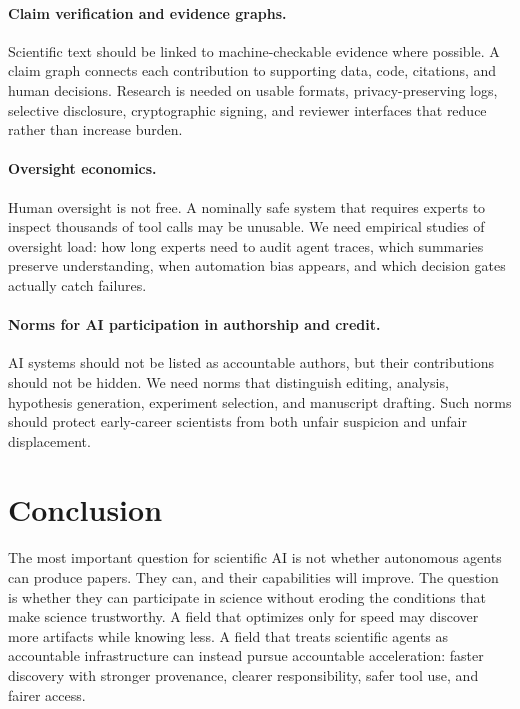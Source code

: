 \documentclass{article}
\newcommand{\position}{accountable acceleration}
\begin{document}
\paragraph{Claim verification and evidence graphs.} Scientific text should be linked to machine-checkable evidence where possible. A claim graph connects each contribution to supporting data, code, citations, and human decisions. Research is needed on usable formats, privacy-preserving logs, selective disclosure, cryptographic signing, and reviewer interfaces that reduce rather than increase burden.

\paragraph{Oversight economics.} Human oversight is not free. A nominally safe system that requires experts to inspect thousands of tool calls may be unusable. We need empirical studies of oversight load: how long experts need to audit agent traces, which summaries preserve understanding, when automation bias appears, and which decision gates actually catch failures.


\paragraph{Norms for AI participation in authorship and credit.} AI systems should not be listed as accountable authors, but their contributions should not be hidden. We need norms that distinguish editing, analysis, hypothesis generation, experiment selection, and manuscript drafting. Such norms should protect early-career scientists from both unfair suspicion and unfair displacement.

\section{Conclusion}

The most important question for scientific AI is not whether autonomous agents can produce papers. They can, and their capabilities will improve. The question is whether they can participate in science without eroding the conditions that make science trustworthy. A field that optimizes only for speed may discover more artifacts while knowing less. A field that treats scientific agents as accountable infrastructure can instead pursue \position{}: faster discovery with stronger provenance, clearer responsibility, safer tool use, and fairer access.




\end{document}
